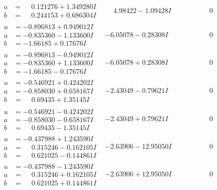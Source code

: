 \documentclass[1p]{elsarticle_modified}
\theoremstyle{definition}
\begin{document}
$$\begin{array}{c|c|c}
\begin{aligned}
a &= \phantom{-}0.121276 + 1.349280 I \\
b &= \phantom{-}0.244153 + 0.686304 I\end{aligned}
 & \phantom{-}4.98422 - 1.09428 I & \phantom{-0.000000 } 0 \\ \hline\begin{aligned}
u &= -0.896813 + 0.949012 I \\
a &= -0.835360 - 1.133600 I \\
b &= -1.66185 + 0.17676 I\end{aligned}
 & -6.05078 - 0.28308 I & \phantom{-0.000000 } 0 \\ \hline\begin{aligned}
u &= -0.896813 - 0.949012 I \\
a &= -0.835360 + 1.133600 I \\
b &= -1.66185 - 0.17676 I\end{aligned}
 & -6.05078 + 0.28308 I & \phantom{-0.000000 } 0 \\ \hline\begin{aligned}
u &= -0.546921 + 0.424202 I \\
a &= -0.858030 + 0.658167 I \\
b &= \phantom{-}0.69435 + 1.35145 I\end{aligned}
 & -2.43049 - 0.79621 I & \phantom{-0.000000 } 0 \\ \hline\begin{aligned}
u &= -0.546921 - 0.424202 I \\
a &= -0.858030 - 0.658167 I \\
b &= \phantom{-}0.69435 - 1.35145 I\end{aligned}
 & -2.43049 + 0.79621 I & \phantom{-0.000000 } 0 \\ \hline\begin{aligned}
u &= -0.437988 + 1.243590 I \\
a &= \phantom{-}0.315246 - 0.162105 I \\
b &= \phantom{-}0.621025 - 0.144861 I\end{aligned}
 & -2.63906 - 12.95050 I & \phantom{-0.000000 } 0 \\ \hline\begin{aligned}
u &= -0.437988 - 1.243590 I \\
a &= \phantom{-}0.315246 + 0.162105 I \\
b &= \phantom{-}0.621025 + 0.144861 I\end{aligned}
 & -2.63906 + 12.95050 I & \phantom{-0.000000 } 0 \\ \hline\begin{aligned}

\end{aligned}
\end{array}$$
\end{document}
